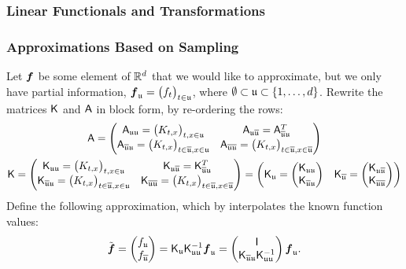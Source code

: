 \documentclass[reqno]{amsart}
\begin{document}
\subsubsection{Linear Functionals and Transformations}


\subsubsection{Approximations Based on Sampling}


Let $\boldsymbol{f}$ be some element of $\mathbb{R}^d$ that we would like to approximate, but we only have partial information, $\boldsymbol{f}_{\mathfrak{u}} = \bigl( f_t \bigr)_{t \in \mathfrak{u}}$, where $\emptyset \subset \mathfrak{u} \subset \{1, \ldots, d\}$.  Rewrite the matrices $\mathsf{K}$ and $\mathsf{A}$ in block form, by re-ordering the rows:
\begin{gather*}
\mathsf{A} = \begin{pmatrix}
\mathsf{A}_{\mathfrak{u} \mathfrak{u}} = \bigl(K_{t,x} \bigr)_{t,x \in \mathfrak{u}} & 
\mathsf{A}_{\mathfrak{u} \overline{\mathfrak{u}}} = \mathsf{A}_{\overline{\mathfrak{u}} \mathfrak{u}}^T \\
\mathsf{A}_{\overline{\mathfrak{u}} \mathfrak{u}} = \bigl(K_{t,x} \bigr)_{t \in \overline{\mathfrak{u}},x \in \mathfrak{u}} &
\mathsf{A}_{\overline{\mathfrak{u}} \overline{\mathfrak{u}}} = \bigl(K_{t,x} \bigr)_{t \in \overline{\mathfrak{u}},x \in \overline{\mathfrak{u}}}
\end{pmatrix} \\
\mathsf{K} = \begin{pmatrix}
\mathsf{K}_{\mathfrak{u} \mathfrak{u}} = \bigl(K_{t,x} \bigr)_{t,x \in \mathfrak{u}} & 
\mathsf{K}_{\mathfrak{u} \overline{\mathfrak{u}}} = \mathsf{K}_{\overline{\mathfrak{u}} \mathfrak{u}}^T \\
\mathsf{K}_{\overline{\mathfrak{u}} \mathfrak{u}} = \bigl(K_{t,x} \bigr)_{t \in \overline{\mathfrak{u}},x \in \mathfrak{u}} &
\mathsf{K}_{\overline{\mathfrak{u}} \overline{\mathfrak{u}}} = \bigl(K_{t,x} \bigr)_{t \in \overline{\mathfrak{u}},x \in \overline{\mathfrak{u}}}
\end{pmatrix} = 
\begin{pmatrix} \mathsf{K}_{\mathfrak{u}} = \begin{pmatrix}
\mathsf{K}_{\mathfrak{u} \mathfrak{u}} \\ \mathsf{K}_{\overline{\mathfrak{u}} \mathfrak{u}} 
\end{pmatrix} & \mathsf{K}_{\overline{\mathfrak{u}}} = \begin{pmatrix}
\mathsf{K}_{\mathfrak{u} \overline{\mathfrak{u}}} \\ \mathsf{K}_{\overline{\mathfrak{u}} \overline{\mathfrak{u}}}
\end{pmatrix} \end{pmatrix}
\end{gather*}
Define the following approximation, which  by interpolates the known function values:
\begin{equation*}
    \tilde{\boldsymbol{f}} = \begin{pmatrix} f_{\mathfrak{u}} \\ f_{\overline{\mathfrak{u}}} \end{pmatrix}
    = \mathsf{K}_{\mathfrak{u}} \mathsf{K}^{-1}_{\mathfrak{u}\mathfrak{u}} \boldsymbol{f}_{\mathfrak{u}} 
    = 
    \begin{pmatrix} \mathsf{I} \\ \mathsf{K}_{\overline{\mathfrak{u}} \mathfrak{u} } \mathsf{K}_{\mathfrak{u}\mathfrak{u}}^{-1} \end{pmatrix} 
    \boldsymbol{f}_{\mathfrak{u}}.
\end{equation*}
\end{document}
